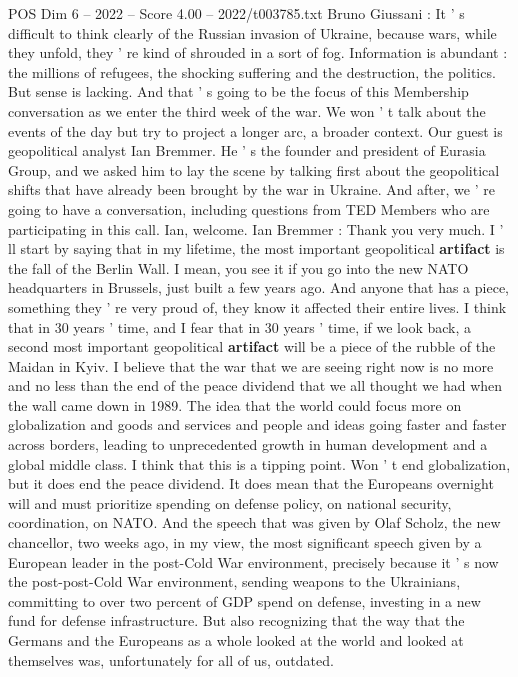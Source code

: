 \begin{textsample}{POS Dim 6 – 2022 – Score 4.00 – 2022/t003785.txt}  \label{ex:f6_pos_068}
Bruno Giussani : It ' s difficult to think clearly of the Russian invasion of Ukraine, because wars, while they unfold, they ' re kind of shrouded in a sort of fog.
Information is abundant : the millions of refugees, the shocking suffering and the destruction, the politics.
But sense is lacking.
And that ' s going to be the focus of this Membership conversation as we enter the third week of the war.
We won ' t talk about the events of the day but try to project a longer arc, a broader context.
Our guest is geopolitical analyst Ian Bremmer.
He ' s the founder and president of Eurasia Group, and we asked him to lay the scene by talking first about the geopolitical shifts that have already been brought by the war in Ukraine.
And after, we ' re going to have a conversation, including questions from TED Members who are participating in this call.
Ian, welcome.
Ian Bremmer : Thank you very much.
I ' ll start by saying that in my lifetime, the most important geopolitical \textbf{artifact} is the fall of the Berlin Wall.
I mean, you see it if you go into the new NATO headquarters in Brussels, just built a few years ago.
And anyone that has a piece, something they ' re very proud of, they know it affected their entire lives.
I think that in 30 years ' time, and I fear that in 30 years ' time, if we look back, a second most important geopolitical \textbf{artifact} will be a piece of the rubble of the Maidan in Kyiv.
I believe that the war that we are seeing right now is no more and no less than the end of the peace dividend that we all thought we had when the wall came down in 1989.
The idea that the world could focus more on globalization and goods and services and people and ideas going faster and faster across borders, leading to unprecedented growth in human development and a global middle class.
I think that this is a tipping point.
Won ' t end globalization, but it does end the peace dividend.
It does mean that the Europeans overnight will and must prioritize spending on defense policy, on national security, coordination, on NATO.
And the speech that was given by Olaf Scholz, the new chancellor, two weeks ago, in my view, the most significant speech given by a European leader in the post-Cold War environment, precisely because it ' s now the post-post-Cold War environment, sending weapons to the Ukrainians, committing to over two percent of GDP spend on defense, investing in a new fund for defense infrastructure.
But also recognizing that the way that the Germans and the Europeans as a whole looked at the world and looked at themselves was, unfortunately for all of us, outdated.

\end{textsample}
